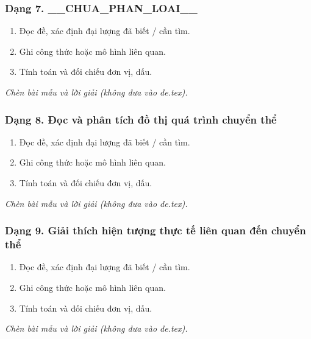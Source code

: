 \subsubsection{Dạng 7. __CHUA_PHAN_LOAI__}
\begin{phuongphap}
\begin{enumerate}
\item Đọc đề, xác định đại lượng đã biết / cần tìm.
\item Ghi công thức hoặc mô hình liên quan.
\item Tính toán và đối chiếu đơn vị, dấu.
\end{enumerate}
\end{phuongphap}
\begin{vidumau}
\textit{Chèn bài mẫu và lời giải (không đưa vào de.tex).}
\end{vidumau}

\subsubsection{Dạng 8. Đọc và phân tích đồ thị quá trình chuyển thể}
\begin{phuongphap}
\begin{enumerate}
\item Đọc đề, xác định đại lượng đã biết / cần tìm.
\item Ghi công thức hoặc mô hình liên quan.
\item Tính toán và đối chiếu đơn vị, dấu.
\end{enumerate}
\end{phuongphap}
\begin{vidumau}
\textit{Chèn bài mẫu và lời giải (không đưa vào de.tex).}
\end{vidumau}

\subsubsection{Dạng 9. Giải thích hiện tượng thực tế liên quan đến chuyển thể}
\begin{phuongphap}
\begin{enumerate}
\item Đọc đề, xác định đại lượng đã biết / cần tìm.
\item Ghi công thức hoặc mô hình liên quan.
\item Tính toán và đối chiếu đơn vị, dấu.
\end{enumerate}
\end{phuongphap}
\begin{vidumau}
\textit{Chèn bài mẫu và lời giải (không đưa vào de.tex).}
\end{vidumau}

